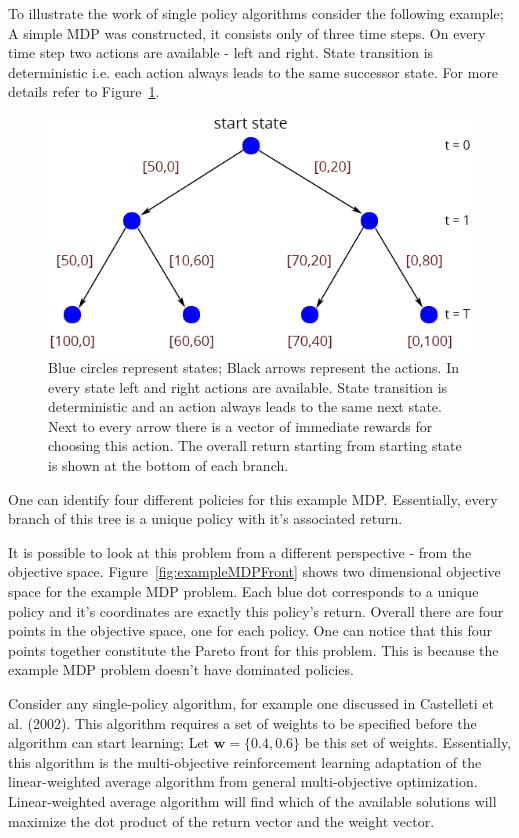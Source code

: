 To illustrate the work of single policy algorithms consider the following example; A simple MDP was constructed, it consists only of three time steps. On every time step two actions are available - left and right. State transition is deterministic i.e. each action always leads to the same successor state. For more details refer to Figure~\ref{fig:decisionTree}.

\begin{figure}[ht]
\centering
\includegraphics[scale=0.6]{decisionTree.png}
\caption{Blue circles represent states; Black arrows represent the actions. In every state left and right actions are available. State transition is deterministic and an action always leads to the same next state. Next to every arrow there is a vector of immediate rewards for choosing this action. The overall return starting from starting state is shown at the bottom of each branch.}
\label{fig:decisionTree}
\end{figure}

One can identify four different policies for this example MDP. Essentially, every branch of this tree is a unique policy with it's associated return.

It is possible to look at this problem from a different perspective - from the objective space. Figure~\ref{fig:exampleMDPFront} shows two dimensional objective space for the example MDP problem. Each blue dot corresponds to a unique policy and it's coordinates are exactly this policy's return. Overall there are four points in the objective space, one for each policy. One can notice that this four points together constitute the Pareto front for this problem. This is because the example MDP problem doesn't have dominated policies.

Consider any single-policy algorithm, for example one discussed in Castelleti et al. (2002)\nocite{castelletti2002reinforcement}. This algorithm requires a set of weights to be specified before the algorithm can start learning; Let $ \textbf{w} = \{0.4,0.6\} $ be this set of weights. Essentially, this algorithm is the multi-objective reinforcement learning adaptation of the linear-weighted average algorithm from general multi-objective optimization. Linear-weighted average algorithm will find which of the available solutions will maximize the dot product of the return vector and the weight vector.



